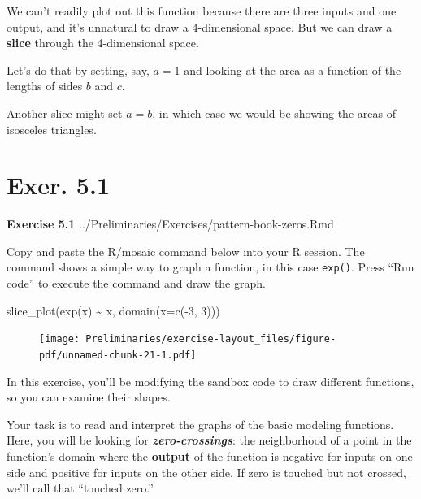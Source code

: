 \documentclass[
  letterpaper,
  DIV=11,
  numbers=noendperiod,
  oneside]{article}
\newenvironment{Shaded}{\begin{snugshade}}{\end{snugshade}}
\newcommand{\AttributeTok}[1]{\textcolor[rgb]{0.40,0.45,0.13}{#1}}
\newcommand{\DecValTok}[1]{\textcolor[rgb]{0.68,0.00,0.00}{#1}}
\newcommand{\FunctionTok}[1]{\textcolor[rgb]{0.28,0.35,0.67}{#1}}
\newcommand{\NormalTok}[1]{\textcolor[rgb]{0.00,0.23,0.31}{#1}}
\newcommand{\SpecialCharTok}[1]{\textcolor[rgb]{0.37,0.37,0.37}{#1}}
\begin{document}
\begin{multicols}{2}
We can't readily plot out this function because there are three inputs
and one output, and it's unnatural to draw a 4-dimensional space. But we
can draw a \textbf{slice} through the 4-dimensional space.

Let's do that by setting, say, \(a=1\) and looking at the area as a
function of the lengths of sides \(b\) and \(c\).

Another slice might set \(a = b\), in which case we would be showing the
areas of isosceles triangles.

\hypertarget{exer.-5.1}{%
\section*{Exer. 5.1}\label{exer.-5.1}}

\textbf{Exercise 5.1} ../Preliminaries/Exercises/pattern-book-zeros.Rmd

Copy and paste the R/mosaic command below into your R session. The
command shows a simple way to graph a function, in this case
\texttt{exp()}. Press ``Run code'' to execute the command and draw the
graph.

\begin{Shaded}
\begin{Highlighting}[]
\FunctionTok{slice\_plot}\NormalTok{(}\FunctionTok{exp}\NormalTok{(x) }\SpecialCharTok{\textasciitilde{}}\NormalTok{ x, }\FunctionTok{domain}\NormalTok{(}\AttributeTok{x=}\FunctionTok{c}\NormalTok{(}\SpecialCharTok{{-}}\DecValTok{3}\NormalTok{, }\DecValTok{3}\NormalTok{)))}
\end{Highlighting}
\end{Shaded}

\begin{figure}[H]

{\centering \texttt{[image: Preliminaries/exercise-layout\_files/figure-pdf/unnamed-chunk-21-1.pdf]}

}

\end{figure}

In this exercise, you'll be modifying the sandbox code to draw different
functions, so you can examine their shapes.

Your task is to read and interpret the graphs of the basic modeling
functions. Here, you will be looking for \textbf{\emph{zero-crossings}}:
the neighborhood of a point in the function's domain where the
\textbf{output} of the function is negative for inputs on one side and
positive for inputs on the other side. If zero is touched but not
crossed, we'll call that ``touched zero.''


\end{multicols}
\end{document}
